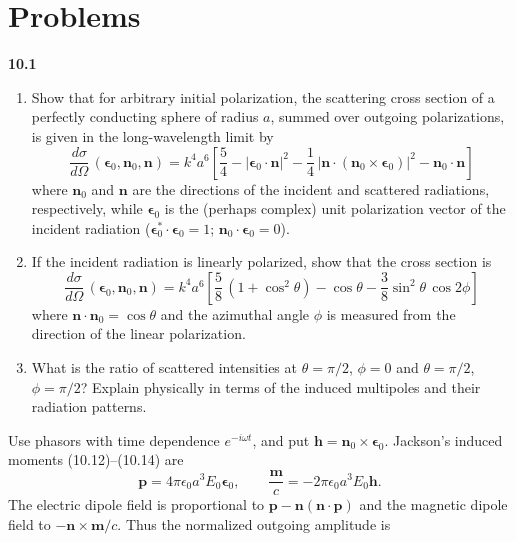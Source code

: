 
\section*{Problems}

\par\bigskip
\noindent\textbf{10.1}\quad\begin{enumerate}
\item[(a)] Show that for arbitrary initial polarization, the scattering cross section of a perfectly conducting sphere of radius $a$, summed over outgoing polarizations, is given in the long-wavelength limit by
\[
\frac{d\sigma}{d\Omega}\,(\boldsymbol{\epsilon}_{0},\mathbf{n}_{0},\mathbf{n})=k^{4}a^{6}\left[\frac{5}{4}-|\boldsymbol{\epsilon}_{0}\cdot\mathbf{n}|^{2}-\frac{1}{4}\,|\mathbf{n}\cdot(\mathbf{n}_{0}\times\boldsymbol{\epsilon}_{0})|^{2}-\mathbf{n}_{0}\cdot\mathbf{n}\right]
\]
where $\mathbf{n}_{0}$ and $\mathbf{n}$ are the directions of the incident and scattered radiations, respectively, while $\boldsymbol{\epsilon}_{0}$ is the (perhaps complex) unit polarization vector of the incident radiation ($\boldsymbol{\epsilon}_{0}^{*}\cdot\boldsymbol{\epsilon}_{0}=1$; $\mathbf{n}_{0}\cdot\boldsymbol{\epsilon}_{0}=0$).
\item[(b)] If the incident radiation is linearly polarized, show that the cross section is
\[
\frac{d\sigma}{d\Omega}\,(\boldsymbol{\epsilon}_{0},\mathbf{n}_{0},\mathbf{n})=k^{4}a^{6}\left[\frac{5}{8}\,(1+\cos^{2}\theta)-\cos\theta-\frac{3}{8}\sin^{2}\theta\,\cos2\phi\right]
\]
where $\mathbf{n}\cdot\mathbf{n}_{0}=\cos\theta$ and the azimuthal angle $\phi$ is measured from the direction of the linear polarization.
\item[(c)] What is the ratio of scattered intensities at $\theta=\pi/2$, $\phi=0$ and $\theta=\pi/2$, $\phi=\pi/2$? Explain physically in terms of the induced multipoles and their radiation patterns.
\end{enumerate}
\solution
Use phasors with time dependence $e^{-i\omega t}$, and put
$\mathbf h=\mathbf n_0\times\boldsymbol\epsilon_0$. Jackson's induced moments
(10.12)--(10.14) are
\[
\mathbf p=4\pi\epsilon_0a^3E_0\boldsymbol\epsilon_0,\qquad
\frac{\mathbf m}{c}=-2\pi\epsilon_0a^3E_0\mathbf h .
\]
The electric dipole field is proportional to
$\mathbf p-\mathbf n(\mathbf n\cdot\mathbf p)$ and the magnetic dipole field
to $-\mathbf n\times\mathbf m/c$. Thus the normalized outgoing amplitude is
